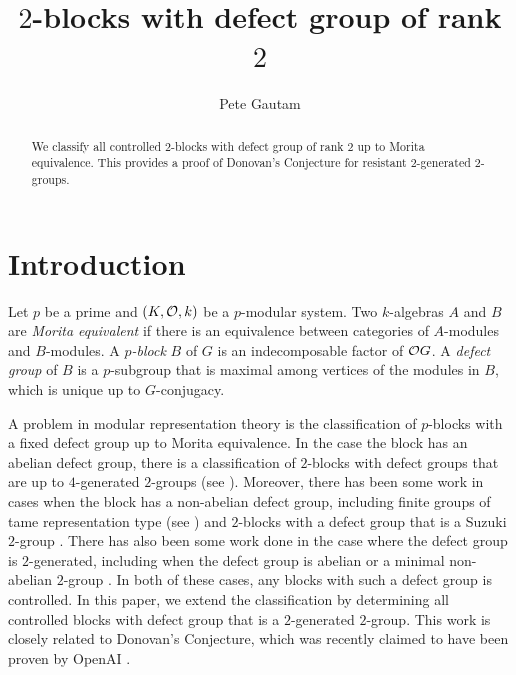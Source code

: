 \documentclass[bysection, amsart]{standard}
\title{$2$-blocks with defect group of rank $2$}
\author{Pete Gautam}
\begin{document}
\begin{abstract}
    We classify all controlled $2$-blocks with defect group of rank $2$ up to Morita equivalence. This provides a proof of Donovan's Conjecture for resistant $2$-generated $2$-groups.
\end{abstract}

\maketitle

\section{Introduction}

Let $p$ be a prime and $(K, \mathcal{O}, k)$ be a $p$-modular system. Two $k$-algebras $A$ and $B$ are \emph{Morita equivalent} if there is an equivalence between categories of $A$-modules and $B$-modules. A \emph{$p$-block} $B$ of $G$ is an indecomposable factor of $\mathcal{O} G$. A \emph{defect group} of $B$ is a $p$-subgroup that is maximal among vertices of the modules in $B$, which is unique up to $G$-conjugacy.

A problem in modular representation theory is the classification of $p$-blocks with a fixed defect group up to Morita equivalence. In the case the block has an abelian defect group, there is a classification of $2$-blocks with defect groups that are up to $4$-generated $2$-groups (see \cite{paper:abelian-rank4}). Moreover, there has been some work in cases when the block has a non-abelian defect group, including finite groups of tame representation type (see \cite{paper:quaternion}) and $2$-blocks with a defect group that is a Suzuki $2$-group \cite{paper:eat-suz}. There has also been some work done in the case where the defect group is $2$-generated, including when the defect group is abelian \cite{paper:hom-rank-2} or a minimal non-abelian $2$-group \cite{paper:ekb-block-mna}. In both of these cases, any blocks with such a defect group is controlled. In this paper, we extend the classification by determining all controlled blocks with defect group that is a $2$-generated $2$-group. This work is closely related to Donovan's Conjecture, which was recently claimed to have been proven by OpenAI \cite{OpenAI}.
\end{document}
